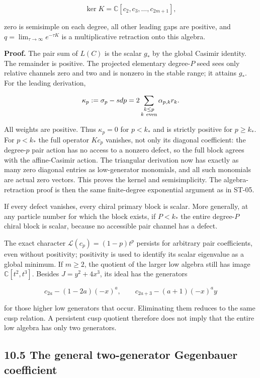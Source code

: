 \documentclass[a4paper,11pt]{article}
\numberwithin{equation}{section}
\begin{document}
\[
\ker K=\mathbb C[c_2,c_3,\ldots,c_{2m+1}],
\]

zero is semisimple on each degree, all other leading gaps are positive, and \(q=\lim_{\tau\to\infty}e^{-\tau K}\) is a multiplicative retraction onto this algebra.

\textbf{Proof.} The pair sum of \(L(C)\) is the scalar \(g_*\) by the global Casimir identity. The remainder is positive. The projected elementary degree-\(P\) seed sees only relative channels zero and two and is nonzero in the stable range; it attains \(g_*\). For the leading derivation,

\[
\kappa_p:=\sigma_p-sdp
=2\sum_{\substack{k\leq p\\k\ {\rm even}}}\alpha_{p,k}r_k.
\]

All weights are positive. Thus \(\kappa_p=0\) for \(p<k_*\) and is strictly positive for \(p\geq k_*\). For \(p<k_*\) the full operator \(Kc_p\) vanishes, not only its diagonal coefficient: the degree-\(p\) pair action has no access to a nonzero defect, so the full block agrees with the affine-Casimir action. The triangular derivation now has exactly as many zero diagonal entries as low-generator monomials, and all such monomials are actual zero vectors. This proves the kernel and semisimplicity. The algebra-retraction proof is then the same finite-degree exponential argument as in ST-05.

If every defect vanishes, every chiral primary block is scalar. More generally, at any particle number for which the block exists, if \(P<k_*\) the entire degree-\(P\) chiral block is scalar, because no accessible pair channel has a defect.

The exact character \(\mathcal L(c_p)=(1-p)t^p\) persists for arbitrary pair coefficients, even without positivity; positivity is used to identify its scalar eigenvalue as a global minimum. If \(m\geq2\), the quotient of the larger low algebra still has image \(\mathbb C[t^2,t^3]\). Besides \(J=y^2+4x^3\), its ideal has the generators

\[
c_{2a}-(1-2a)(-x)^a,\qquad
c_{2a+3}-(a+1)(-x)^a y
\]

for those higher low generators that occur. Eliminating them reduces to the same cusp relation. A persistent cusp quotient therefore does not imply that the entire low algebra has only two generators.

\hypertarget{the-general-two-generator-gegenbauer-coefficient}{%
\subsection{10.5 The general two-generator Gegenbauer coefficient}\label{the-general-two-generator-gegenbauer-coefficient}}
\end{document}
